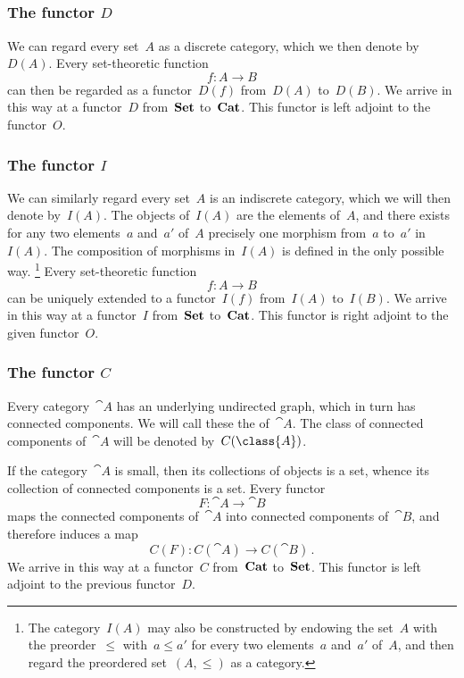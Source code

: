 \subsection{}



\subsubsection*{The functor \texorpdfstring{$D$}{D}}

We can regard every set~$A$ as a discrete category, which we then denote by~$D(A)$.
Every set-theoretic function
\[
	f \colon A \to B
\]
can then be regarded as a functor~$D(f)$ from~$D(A)$ to~$D(B)$.
We arrive in this way at a functor~$D$ from~$\mathbf{Set}$ to~$\mathbf{Cat}$.
This functor is left adjoint to the functor~$O$.



\subsubsection*{The functor \texorpdfstring{$I$}{I}}

We can similarly regard every set~$A$ is an indiscrete category, which we will then denote by~$I(A)$.
The objects of~$I(A)$ are the elements of~$A$, and there exists for any two elements~$a$ and~$a'$ of~$A$ precisely one morphism from~$a$ to~$a'$ in~$I(A)$.
The composition of morphisms in~$I(A)$ is defined in the only possible way.%
\footnote{
	The category~$I(A)$ may also be constructed by endowing the set~$A$ with the preorder~$≤$ with~$a ≤ a'$ for every two elements~$a$ and~$a'$ of~$A$, and then regard the preordered set~$(A, ≤)$ as a category.
}
Every set-theoretic function
\[
	f \colon A \to B
\]
can be uniquely extended to a functor~$I(f)$ from~$I(A)$ to~$I(B)$.
We arrive in this way at a functor~$I$ from~$\mathbf{Set}$ to~$\mathbf{Cat}$.
This functor is right adjoint to the given functor~$O$.



\subsubsection*{The functor \texorpdfstring{$C$}{C}}

Every category~$\cat{A}$ has an underlying undirected graph, which in turn has connected components.
We will call these the  of~$\cat{A}$.
The class of connected components of~$\cat{A}$ will be denoted by~$C(\class{A})$.

If the category~$\cat{A}$ is small, then its collections of objects is a set, whence its collection of connected components is a set.
Every functor
\[
	F \colon \cat{A} \to \cat{B}
\]
maps the connected components of~$\cat{A}$ into connected components of~$\cat{B}$, and therefore induces a map
\[
	C(F) \colon C(\cat{A}) \to C(\cat{B}) \,.
\]
We arrive in this way at a functor~$C$ from~$\mathbf{Cat}$ to~$\mathbf{Set}$.
This functor is left adjoint to the previous functor~$D$.
